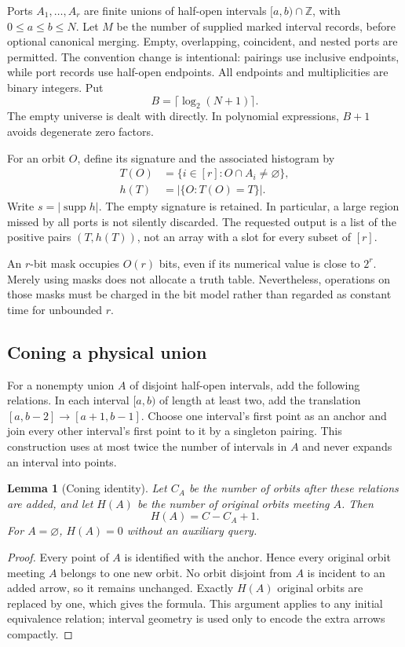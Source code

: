 \documentclass[11pt]{article}
\newtheorem{lemma}[theorem]{Lemma}
\theoremstyle{definition}
\newcommand{\supp}{\operatorname{supp}}
\newcommand{\ZZ}{\mathbb{Z}}
\begin{document}
Ports $A_1,\ldots,A_r$ are finite unions of half-open intervals
$[a,b)\cap\ZZ$, with $0\leq a\leq b\leq N$. Let $M$ be the number of
supplied marked interval records, before optional canonical merging. Empty,
overlapping, coincident, and nested ports are permitted. The convention
change is intentional: pairings use inclusive endpoints, while port records
use half-open endpoints. All endpoints and multiplicities are binary integers.
Put
\[
 B=\lceil\log_2(N+1)\rceil.
\]
The empty universe is dealt with directly. In polynomial expressions,
$B+1$ avoids degenerate zero factors.

For an orbit $O$, define its signature and the associated histogram by
\begin{align}
 T(O)&=\{i\in[r]:O\cap A_i\neq\varnothing\},\label{eq:signature}\\
 h(T)&=|\{O:T(O)=T\}|.\label{eq:histogram}
\end{align}
Write $s=|\supp h|$. The empty signature is retained. In particular, a
large region missed by all ports is not silently discarded. The requested
output is a list of the positive pairs $(T,h(T))$, not an array with a slot
for every subset of $[r]$.

An $r$-bit mask occupies $O(r)$ bits, even if its numerical value is close
to $2^r$. Merely using masks does not allocate a truth table. Nevertheless,
operations on those masks must be charged in the bit model rather than
regarded as constant time for unbounded $r$.

\subsection{Coning a physical union}
For a nonempty union $A$ of disjoint half-open intervals, add the following
relations. In each interval $[a,b)$ of length at least two, add the
translation $[a,b-2]\to[a+1,b-1]$. Choose one interval's first point as an
anchor and join every other interval's first point to it by a singleton
pairing. This construction uses at most twice the number of intervals in
$A$ and never expands an interval into points.

\begin{lemma}[Coning identity]
\label{lem:cone}
Let $C_A$ be the number of orbits after these relations are added, and let
$H(A)$ be the number of original orbits meeting $A$. Then
\[
 H(A)=C-C_A+1.
\]
For $A=\varnothing$, $H(A)=0$ without an auxiliary query.
\end{lemma}
\begin{proof}
Every point of $A$ is identified with the anchor. Hence every original orbit
meeting $A$ belongs to one new orbit. No orbit disjoint from $A$ is incident
to an added arrow, so it remains unchanged. Exactly $H(A)$ original orbits
are replaced by one, which gives the formula. This argument applies to any
initial equivalence relation; interval geometry is used only to encode the
extra arrows compactly.
\end{proof}
\end{document}
